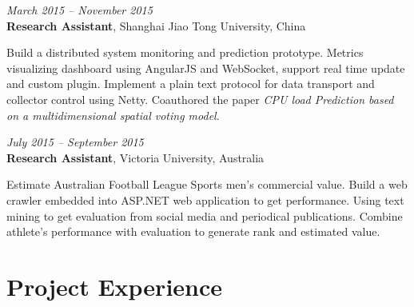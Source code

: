\documentclass[fontsize=10pt]{tccv}
\begin{document}
\begin{eventlist}


\textit{March 2015 -- November 2015} \\
\textbf{Research Assistant}, Shanghai Jiao Tong University, China\smallskip

Build a distributed system monitoring and prediction prototype.
Metrics visualizing dashboard using AngularJS and WebSocket, support real time update and custom plugin.
Implement a plain text protocol for data transport and collector control using Netty.
Coauthored the paper \textit{CPU load Prediction based on a multidimensional spatial voting model}.

\medskip


\textit{July 2015 -- September 2015} \\
\textbf{Research Assistant}, Victoria University, Australia\smallskip

Estimate Australian Football League Sports men's commercial value.
Build a web crawler embedded into ASP.NET web application to get performance.
Using text mining to get evaluation from social media and periodical publications.
Combine athlete's performance with evaluation to generate rank and estimated value.

\end{eventlist}

\section{Project Experience}
\end{document}
